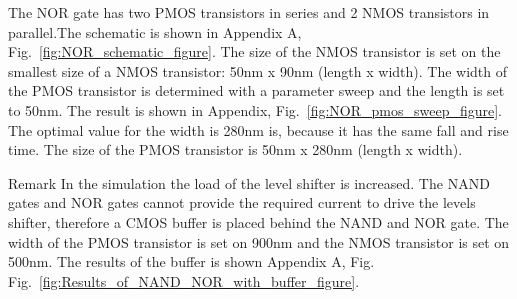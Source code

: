 The NOR gate has two PMOS transistors in series and 2 NMOS transistors in parallel.The schematic is shown in Appendix A, Fig.~\ref{fig:NOR_schematic_figure}. The size of the NMOS transistor is set on the smallest size of a NMOS transistor: 50nm x 90nm (length x width). The width of the PMOS transistor is determined with a parameter sweep and the length is set to 50nm. The result is shown in Appendix, Fig.~\ref{fig:NOR_pmos_sweep_figure}. The optimal value for the width is 280nm is, because it has the same fall and rise time. The size of the PMOS transistor is 50nm x 280nm (length x width).

Remark
In the simulation the load of the level shifter is increased. The NAND gates and NOR gates cannot provide the required current to drive the levels shifter, therefore a CMOS buffer is placed behind the NAND and NOR gate. The width of the PMOS transistor is set on 900nm and the NMOS transistor is set on 500nm. The results of the buffer is shown Appendix A, Fig. Fig.~\ref{fig:Results_of_NAND_NOR_with_buffer_figure}.

